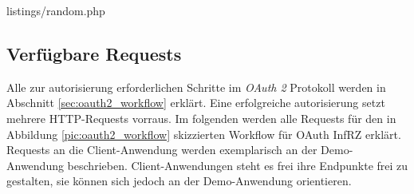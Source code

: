 \documentclass[12pt,a4paper,pointednumbers,abstracton]{scrartcl}
\begin{document}
\begin{minipage}{\textwidth}
	
	{listings/random.php}
\end{minipage}

\subsection{Verfügbare Requests}

Alle zur autorisierung erforderlichen Schritte im \emph{OAuth 2} Protokoll werden in Abschnitt \ref{sec:oauth2_workflow} erklärt.
Eine erfolgreiche autorisierung setzt mehrere HTTP-Requests vorraus.
Im folgenden werden alle Requests für den in Abbildung \ref{pic:oauth2_workflow} skizzierten Workflow für OAuth InfRZ erklärt.
Requests an die Client-Anwendung werden exemplarisch an der Demo-Anwendung beschrieben.
Client-Anwendungen steht es frei ihre Endpunkte frei zu gestalten, sie können sich jedoch an der Demo-Anwendung orientieren.
\end{document}
